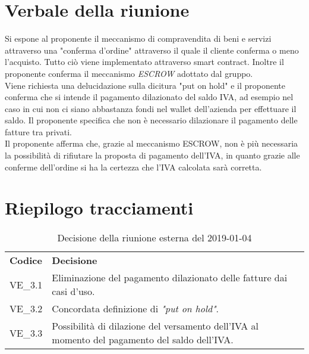 \section{Verbale della riunione}
Si espone al proponente il meccanismo di compravendita di beni e servizi attraverso
una "conferma d'ordine" attraverso il quale il cliente conferma o meno l'acquisto.
Tutto ciò viene implementato attraverso smart contract\glo{}. Inoltre il proponente
conferma il meccanismo \textit{ESCROW\glo{}} adottato dal gruppo. \\
Viene richiesta una delucidazione sulla dicitura "put on hold" e il proponente conferma
che si intende il pagamento dilazionato del saldo IVA, ad esempio nel caso in cui non 
ci siano abbastanza fondi nel wallet\glo{} dell'azienda per effettuare il saldo. 
Il proponente specifica che non è necessario dilazionare il pagamento delle fatture 
tra privati. \\
Il proponente afferma che, grazie al meccanismo ESCROW\glo{}, non è più necessaria
la possibilità di rifiutare la proposta di pagamento dell'IVA, in quanto grazie alle 
conferme dell'ordine si ha la certezza che l'IVA calcolata sarà corretta.

\pagebreak

\section{Riepilogo tracciamenti}
\begin{table}[H]
	
	\begin{longtable}{ >{\centering}p{} >{\centering}p{}}
			
		\rowcolorhead
		\centering \textbf{\color{white}Codice} 
		& \centering \textbf{\color{white}Decisione} 
		
		\tabularnewline 
		VE\_3.1 & Eliminazione del pagamento dilazionato delle fatture dai casi d'uso.
		
		\tabularnewline 
		VE\_3.2 & Concordata definizione di \textit{"put on hold"}.
		
		\tabularnewline 
		VE\_3.3 & Possibilità di dilazione del versamento dell'IVA al momento del 
						pagamento del saldo dell'IVA.

		
	\end{longtable}
	\caption{Decisione della riunione esterna del 2019-01-04}	

\end{table}

